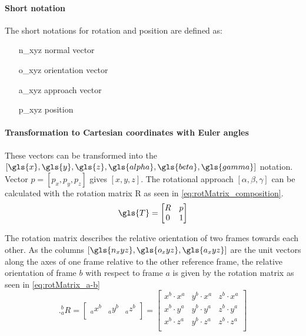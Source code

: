 \paragraph{Short notation}
The short notations for rotation and position are defined as:

\begin{itemize}
	\item[\gls{n_xyz}] normal vector
	\item[\gls{o_xyz}] orientation vector
	\item[\gls{a_xyz}] approach vector
	\item[\gls{p_xyz}] position
\end{itemize}


\paragraph{Transformation to Cartesian coordinates with Euler angles }
These vectors can be transformed into the $[\gls{x},\gls{y},\gls{z},\gls{alpha},\gls{beta},\gls{gamma}]$ notation.
Vector $p = [p_x, p_y, p_z] $ gives $[x,y,z]$.
The rotational approach $[\alpha, \beta, \gamma]$ can be calculated with the rotation matrix \gls{R} as seen in \ref{eq:rotMatrix_composition}.
\begin{equation}\label{eq:rotMatrix_composition}
\gls{T} = 
\begin{bmatrix}
R & p \\
0 & 1 \\
\end{bmatrix}
\end{equation}

The rotation matrix describes the relative orientation of two frames towards each other. As the columns $[\gls{n_xyz},\gls{o_xyz},\gls{a_xyz}]$ are the unit vectors along the axes of one frame relative to the other reference frame, the relative orientation of frame ${b}$ with respect to frame ${a}$ is given by the rotation matrix as seen in  \ref{eq:rotMatrix_a-b} \cite{ConstantinForwardKA}
\begin{equation}\label{eq:rotMatrix_a-b}.
\phantom{}^b_aR =
\begin{bmatrix}
\phantom{}_ax^b & \phantom{}_ay^b & \phantom{}_az^b \\
\end{bmatrix}
=
\begin{bmatrix}
x^b \cdot x^a & y^b \cdot x^a & z^b \cdot x^a \\
x^b \cdot y^a & y^b \cdot y^a & z^b \cdot y^a \\
x^b \cdot z^a & y^b \cdot z^a & z^b \cdot z^a \\
\end{bmatrix}
\end{equation}

